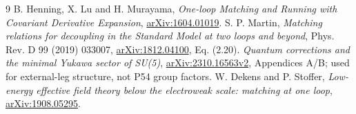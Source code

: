 \documentclass[11pt]{article}
\begin{document}
\begin{thebibliography}{9}
 B. Henning, X. Lu and H. Murayama,
\emph{One-loop Matching and Running with Covariant Derivative Expansion},
\href{https://arxiv.org/abs/1604.01019}{arXiv:1604.01019}.
 S. P. Martin,
\emph{Matching relations for decoupling in the Standard Model at two
loops and beyond}, Phys. Rev. D 99 (2019) 033007,
\href{https://arxiv.org/abs/1812.04100}{arXiv:1812.04100}, Eq. (2.20).
 \emph{Quantum corrections and the minimal Yukawa sector
of SU(5)}, \href{https://arxiv.org/html/2310.16563v2}{arXiv:2310.16563v2},
Appendices A/B; used for external-leg structure, not P54 group factors.
 W. Dekens and P. Stoffer,
\emph{Low-energy effective field theory below the electroweak scale:
matching at one loop},
\href{https://arxiv.org/abs/1908.05295}{arXiv:1908.05295}.
\end{thebibliography}
\end{document}
